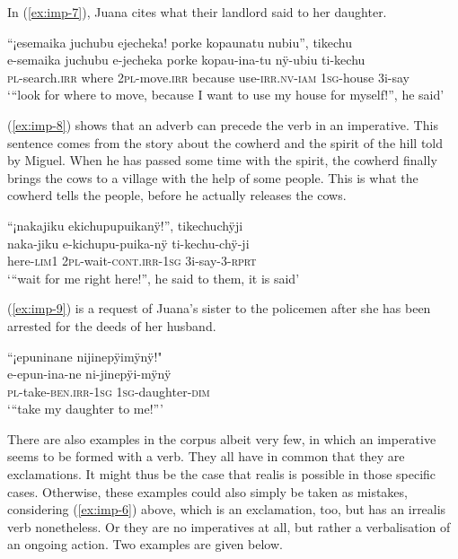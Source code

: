 In (\ref{ex:imp-7}), Juana cites what their landlord said to her daughter. 

\ea\label{ex:imp-7}
\begingl
\glpreamble “¡esemaika juchubu ejecheka! porke kopaunatu nubiu”, tikechu\\
\gla e-semaika juchubu e-jecheka porke kopau-ina-tu nÿ-ubiu ti-kechu\\
\textsc{pl}-search.\textsc{irr} where 2\textsc{pl}-move.\textsc{irr} because use-\textsc{irr.nv}-\textsc{iam} 1\textsc{sg}-house 3i-say\\
\glft ‘“look for where to move, because I want to use my house for myself!”, he said’
\endgl
\trailingcitation{[jxx-p120430l-1.397]}
\xe

(\ref{ex:imp-8}) shows that an adverb can precede the verb in an imperative. This sentence comes from the story about the cowherd and the spirit of the hill told by Miguel. When he has passed some time with the spirit, the cowherd finally brings the cows to a village with the help of some people. This is what the cowherd tells the people, before he actually releases the cows.

\ea\label{ex:imp-8}
\begingl 
\glpreamble “¡nakajiku ekichupupuikanÿ!”, tikechuchÿji\\
\gla naka-jiku e-kichupu-puika-nÿ ti-kechu-chÿ-ji\\ 
\glb here-\textsc{lim}1 2\textsc{pl}-wait-\textsc{cont}.\textsc{irr}-1\textsc{sg} 3i-say-3-\textsc{rprt}\\ 
\glft ‘“wait for me right here!”, he said to them, it is said’\\ 
\endgl
\trailingcitation{[mxx-n151017l-1.81]}
\xe

(\ref{ex:imp-9}) is a request of Juana’s sister to the policemen after she has been arrested for the deeds of her husband.

\ea\label{ex:imp-9}
\begingl
\glpreamble “¡epuninane nijinepÿimÿnÿ!"\\
\gla e-epun-ina-ne ni-jinepÿi-mÿnÿ\\
\textsc{pl}-take-\textsc{ben.irr}-1\textsc{sg} 1\textsc{sg}-daughter-\textsc{dim}\\
\glft ‘“take my daughter to me!”’
\endgl
\trailingcitation{[jxx-p120430l-2.101]}
\xe

There are also examples in the corpus albeit very few, in which an imperative seems to be formed with a  verb. They all have in common that they are exclamations. It might thus be the case that realis is possible in those specific cases. Otherwise, these examples could also simply be taken as mistakes, considering (\ref{ex:imp-6}) above, which is an exclamation, too, but has an irrealis verb nonetheless. Or they are no imperatives at all, but rather a verbalisation of an ongoing action. Two examples are given below.

